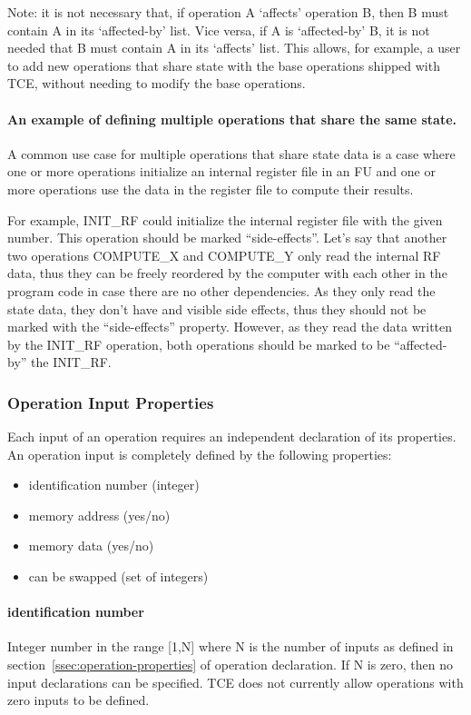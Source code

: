 \documentclass[twoside]{tceusermanual}
\begin{document}
Note: it is not necessary that, if operation A `affects' operation B, then B
must contain A in its `affected-by' list.  Vice versa, if A is `affected-by'
B, it is not needed that B must contain A in its `affects' list. This
allows, for example, a user to add new operations that share state with 
the base operations shipped with TCE, without needing to modify the base
operations.

\paragraph{An example of defining multiple operations that share the
same state.} A common use case for multiple operations that share
state data is a case where one or more operations initialize an
internal register file in an FU and one or more operations use the
data in the register file to compute their results.

For example, INIT\_RF could initialize the internal register
file with the given number. This operation should be marked
``side-effects''. Let's say that another two operations COMPUTE\_X and
COMPUTE\_Y only read the internal RF data, thus they can be freely
reordered by the computer with each other in the program code in case
there are no other dependencies. As they only read the state data,
they don't have and visible side effects, thus they should not
be marked with the ``side-effects'' property. However, as they read
the data written by the INIT\_RF operation, both operations should
be marked to be ``affected-by'' the INIT\_RF.

\subsubsection{Operation Input Properties}
\label{ssec:opinput-properties}

Each input of an operation requires an independent declaration of its
properties.  An operation input is completely defined by the following
properties:
\begin{itemize}
\item identification number (integer)
\item memory address (yes/no)
\item memory data (yes/no)
\item can be swapped (set of integers)
\end{itemize}

\paragraph{identification number}
Integer number in the range [1,N] where N is the number of inputs as defined
in section~\ref{ssec:operation-properties} of operation declaration.  If N
is zero, then no input declarations can be specified. TCE does not currently
allow operations with zero inputs to be defined.
\end{document}
